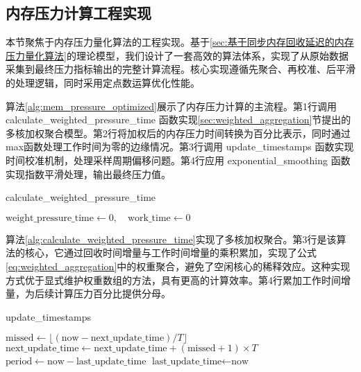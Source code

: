 \subsection{内存压力计算工程实现}
\label{sec:内存压力计算算法}

本节聚焦于内存压力量化算法的工程实现。基于\ref{sec:基于同步内存回收延迟的内存压力量化算法}的理论模型，我们设计了一套高效的算法体系，实现了从原始数据采集到最终压力指标输出的完整计算流程。核心实现遵循先聚合、再校准、后平滑的处理逻辑，同时采用定点数运算优化性能。



算法\ref{alg:mem_pressure_optimized}展示了内存压力计算的主流程。第1行调用\\
 calculate\_weighted\_pressure\_time 函数实现\ref{sec:weighted_aggregation}节提出的多核加权聚合模型。第2行将加权后的内存压力时间转换为百分比表示，同时通过max函数处理工作时间为零的边缘情况。第3行调用 update\_timestamps 函数实现时间校准机制，处理采样周期偏移问题。第4行应用 exponential\_smoothing 函数实现指数平滑处理，输出最终压力值。

\begin{algorithm}[htbp]
\caption{calculate\_weighted\_pressure\_time}
\label{alg:calculate_weighted_pressure_time}
\SetAlgoLined
\DontPrintSemicolon
{}
\(\text{weight\_pressure\_time} \gets 0,\quad \text{work\_time} \gets 0\)\;
\end{algorithm}

算法\ref{alg:calculate_weighted_pressure_time}实现了多核加权聚合。第3行是该算法的核心，它通过回收时间增量与工作时间增量的乘积累加，实现了公式\ref{eq:weighted_aggregation}中的权重聚合，避免了空闲核心的稀释效应。这种实现方式优于显式维护权重数组的方法，具有更高的计算效率。第4行累加工作时间增量，为后续计算压力百分比提供分母。


\begin{algorithm}[htbp]
\caption{update\_timestamps}
\label{alg:update_timestamps}
\SetAlgoLined
\DontPrintSemicolon
{}
\(\text{missed} \gets \lfloor(\text{now}-\text{next\_update\_time})/T\rfloor\)\;
\(\text{next\_update\_time} \gets \text{next\_update\_time} + (\text{missed}+1) \times T\)\;
\(\text{period}\gets \text{now}-\text{last\_update\_time}\)\;
 \(\text{last\_update\_time}\gets \text{now}\)\;
\end{algorithm}

